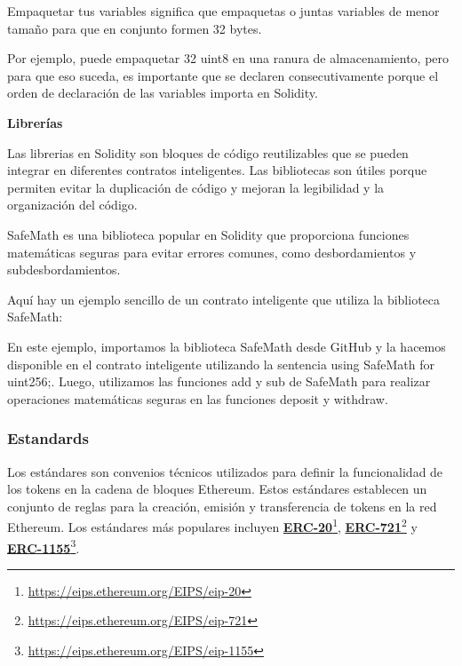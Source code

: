 \bigskip

Empaquetar tus variables significa que empaquetas o juntas variables de menor tamaño para que en conjunto formen 32 bytes.

\bigskip

Por ejemplo, puede empaquetar 32 uint8 en una ranura de almacenamiento, pero para que eso suceda, es importante que se declaren consecutivamente porque el orden de declaración de las variables importa en Solidity.

\newpage

\bigskip

\textbf{Librerías}

\bigskip

Las librerias en Solidity son bloques de código reutilizables que se pueden integrar en diferentes contratos inteligentes. Las bibliotecas son útiles porque permiten evitar la duplicación de código y mejoran la legibilidad y la organización del código.

\bigskip

SafeMath es una biblioteca popular en Solidity que proporciona funciones matemáticas seguras para evitar errores comunes, como desbordamientos y subdesbordamientos. 

\bigskip

Aquí hay un ejemplo sencillo de un contrato inteligente que utiliza la biblioteca SafeMath:

\bigskip



En este ejemplo, importamos la biblioteca SafeMath desde GitHub y la hacemos disponible en el contrato inteligente utilizando la sentencia using SafeMath for uint256;. Luego, utilizamos las funciones add y sub de SafeMath para realizar operaciones matemáticas seguras en las funciones deposit y withdraw.

\subsubsection{Estandards}

Los estándares son convenios técnicos utilizados para definir la funcionalidad de los tokens en la cadena de bloques Ethereum. Estos estándares establecen un conjunto de reglas para la creación, emisión y transferencia de tokens en la red Ethereum. Los estándares más populares incluyen \textcolor{blue}{\href{https://eips.ethereum.org/EIPS/eip-20}{\textbf{ERC-20}}}\footnote{\url{https://eips.ethereum.org/EIPS/eip-20}}, \textcolor{blue}{\href{https://eips.ethereum.org/EIPS/eip-721}{\textbf{ERC-721}}}\footnote{\url{https://eips.ethereum.org/EIPS/eip-721}} y \textcolor{blue}{\href{https://eips.ethereum.org/EIPS/eip-1155}{\textbf{ERC-1155}}}\footnote{\url{https://eips.ethereum.org/EIPS/eip-1155}}.

